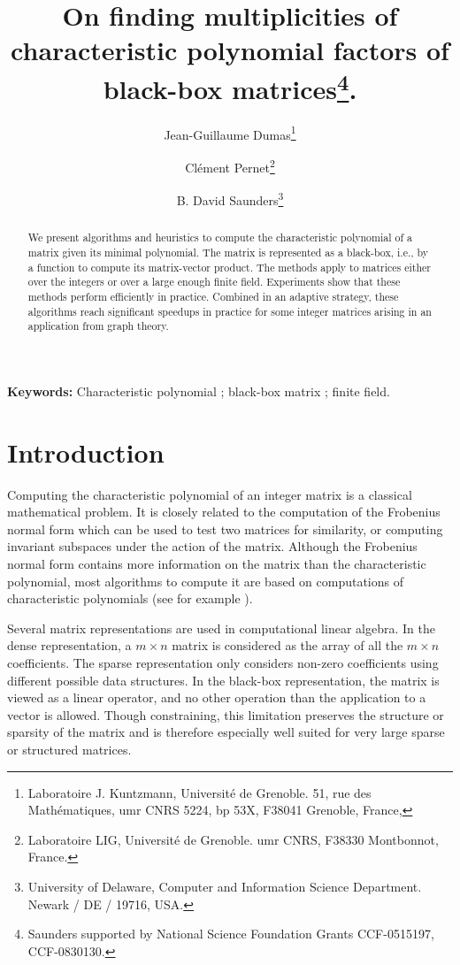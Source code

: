 \documentclass{article}
\begin{document}
\title{On finding multiplicities of characteristic polynomial factors
  of black-box matrices\thanks{Saunders supported by National Science
    Foundation Grants CCF-0515197, CCF-0830130.}.
}
\author{
Jean-Guillaume Dumas\thanks{Laboratoire J. Kuntzmann, Universit\'e de
  Grenoble. 51, rue des Math\'ematiques, umr CNRS 5224, bp 53X, F38041
  Grenoble, France, \jgdemail}
\and Cl\'ement Pernet\thanks{Laboratoire LIG, Universit\'e de
  Grenoble. umr CNRS, F38330 Montbonnot, France. \cpemail}
\and B. David Saunders\thanks{University of Delaware, Computer and
  Information Science Department. Newark / DE / 19716, USA. \bdsemail}
}

\maketitle


\begin{abstract}
We present algorithms and heuristics to compute the characteristic polynomial of a
matrix given its minimal polynomial. 
The matrix is represented as a black-box, i.e., by a function to compute
its matrix-vector product. 
The methods apply to matrices either over the integers or over a large enough finite field.
Experiments show that these methods perform efficiently in practice. Combined in
an adaptive strategy, these algorithms reach significant speedups in practice
for some integer matrices arising in an application from graph theory.
 \end{abstract}
 \noindent
 {\bf Keywords:} Characteristic polynomial ; black-box matrix ; finite field.

\section{Introduction}
Computing the characteristic polynomial of an integer matrix is a
classical mathematical problem. 
It is closely related to the computation of the Frobenius normal form
which can be used to test two matrices for similarity, or computing invariant
subspaces under the action of the matrix.
Although the Frobenius normal form contains more information on 
the matrix than the characteristic polynomial, most algorithms to
compute it are based on computations of characteristic polynomials (see
for example \cite[\S 9.7]{Storjohann:2000:thesis}).

Several matrix representations are used in computational linear algebra. In the
dense representation, a $m\times n$ matrix is considered as the array of all the $m\times n$
coefficients. 
The sparse representation only considers non-zero coefficients using different possible
data structures. In the black-box representation,  the matrix is viewed  as a linear
operator, and no other operation than the application to a vector is
allowed. Though constraining, this limitation preserves the structure or
sparsity of the matrix and is therefore especially well suited for very large
sparse or structured matrices.
\end{document}

